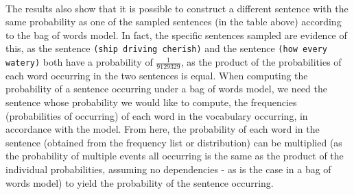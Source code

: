 \documentclass[10pt]{article}
\begin{document}
\paragraph{} The results also show that it is possible to construct a different sentence with the same probability as one of the sampled sentences (in the table above) according to the bag of words model. In fact, the specific sentences sampled are evidence of this, as the sentence \texttt{(ship driving cherish)} and the sentence \texttt{(how every watery)} both have a probability of $\frac{1}{9129329}$, as the product of the probabilities of each word occurring in the two sentences is equal. When computing the probability of a sentence occurring under a bag of words model, we need the sentence whose probability we would like to compute, the frequencies (probabilities of occurring) of each word in the vocabulary occurring, in accordance with the model. From here, the probability of each word in the sentence (obtained from the frequency list or distribution) can be multiplied (as the probability of multiple events all occurring is the same as the product of the individual probabilities, assuming no dependencies - as is the case in a bag of words model) to yield the probability of the sentence occurring.
\end{document}

